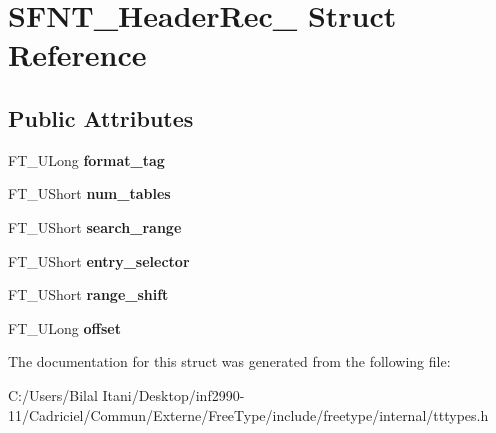 \hypertarget{struct_s_f_n_t___header_rec__}{}\section{S\+F\+N\+T\+\_\+\+Header\+Rec\+\_\+ Struct Reference}
\label{struct_s_f_n_t___header_rec__}
\subsection*{Public Attributes}
\begin{DoxyCompactItemize}
\item 
F\+T\+\_\+\+U\+Long {\bfseries format\+\_\+tag}\hypertarget{struct_s_f_n_t___header_rec___ad59d649b189ab19fae02341e95e02448}{}\label{struct_s_f_n_t___header_rec___ad59d649b189ab19fae02341e95e02448}

\item 
F\+T\+\_\+\+U\+Short {\bfseries num\+\_\+tables}\hypertarget{struct_s_f_n_t___header_rec___a46d8d8bf8f2d8b6536eb5fa5704852e2}{}\label{struct_s_f_n_t___header_rec___a46d8d8bf8f2d8b6536eb5fa5704852e2}

\item 
F\+T\+\_\+\+U\+Short {\bfseries search\+\_\+range}\hypertarget{struct_s_f_n_t___header_rec___a39ca0e21eaec6be602547bb2ed898d5d}{}\label{struct_s_f_n_t___header_rec___a39ca0e21eaec6be602547bb2ed898d5d}

\item 
F\+T\+\_\+\+U\+Short {\bfseries entry\+\_\+selector}\hypertarget{struct_s_f_n_t___header_rec___ada628a85486eb034abd56b872ecdcd78}{}\label{struct_s_f_n_t___header_rec___ada628a85486eb034abd56b872ecdcd78}

\item 
F\+T\+\_\+\+U\+Short {\bfseries range\+\_\+shift}\hypertarget{struct_s_f_n_t___header_rec___aa2a39db194a8a9a0cc8504143ac4f5c1}{}\label{struct_s_f_n_t___header_rec___aa2a39db194a8a9a0cc8504143ac4f5c1}

\item 
F\+T\+\_\+\+U\+Long {\bfseries offset}\hypertarget{struct_s_f_n_t___header_rec___a04f99ce2ff335f8702a4edf7132a3e04}{}\label{struct_s_f_n_t___header_rec___a04f99ce2ff335f8702a4edf7132a3e04}

\end{DoxyCompactItemize}


The documentation for this struct was generated from the following file\+:\begin{DoxyCompactItemize}
\item 
C\+:/\+Users/\+Bilal Itani/\+Desktop/inf2990-\/11/\+Cadriciel/\+Commun/\+Externe/\+Free\+Type/include/freetype/internal/tttypes.\+h\end{DoxyCompactItemize}
